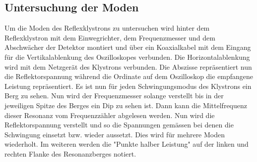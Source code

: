 \subsection{Untersuchung der Moden}
\label{sec:moden}
Um die Moden des Reflexklystrons zu untersuchen wird hinter dem Reflexklystron mit dem Einwegrichter, dem 
Frequenzmesser und dem Abschwächer der Detektor montiert und über ein Koaxialkabel mit dem Eingang
für die Vertikalablenkung des Oszilloskopes verbunden. Die Horizontalablenkung wird mit dem Netzgerät des Klystrons
verbunden. Die Abszisse repräsentiert nun die Reflektorspannung während die Ordinate auf dem Oszilloskop
die empfangene Leistung repräsentiert. Es ist nun für jeden Schwingungsmodus des Klystrons ein Berg zu sehen.
Nun wird der Frequenzmesser solange verstellt bis in der jeweiligen Spitze des Berges ein Dip zu sehen ist.
Dann kann die Mittelfrequenz dieser Resonanz vom Frequenzzähler abgelesen werden. Nun wird die Reflektorspannung
verstellt und so die Spannungen gemässen bei denen die Schwingung einsetzt bzw. wieder aussetzt. Dies wird für mehrere
Moden wiederholt. Im weiteren werden die "Punkte halber Leistung" auf der linken und rechten Flanke des 
Resonanzberges notiert.

\subsection{}

